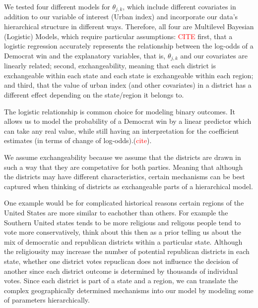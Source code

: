 \documentclass[12pt]{article}
\begin{document}
We tested four different models for $\theta_{j,k}$, which include different covariates in addition to our variable of interest (Urban index) and incorporate our data's hierarchical structure in different ways. Therefore, all four are Multilevel Bayesian (Logistic) Models, which require particular assumptions: \textcolor{red}{CITE} 
first, that a logistic regression accurately represents the relationship between the log-odds of a Democrat win and the explanatory variables, that is, $\theta_{j,k}$ and our covariates are linearly related; second, exchangeability, meaning that each district is exchangeable within each state and each state is exchangeable within each region; and third, that the value of urban index (and other covariates) in a district has a different effect depending on the state/region it belongs to.


The logistic relationship is common choice for modeling binary outcomes. It allows us to model the probability of a Democrat win by a linear predictor which can take any real value, while still having an interpretation for the coefficient estimates (in terms of change of log-odds).(\textcolor{red}{cite}).


We assume exchangeability because  we assume that the districts are drawn in such a way that they are competative for both parties. Meaning that although the districts may have different characteristics, certain mechanisms can be best captured when thinking of districts as exchangeable parts of  a hierarchical model. 


One example would be for complicated historical reasons certain regions of the United States are more similar to eachother than others. For example the Southern United states tends to be more religious and religous people tend to vote more conservatively, think about this then as a prior telling us about the mix of democratic and republican districts within a particular state. Although the religiousity may increase the number of potential republican districts in each state, whether one district votes repuclican does not influence the decision of another since each district outcome is determined by thousands of individual votes. 
Since each district is part of a state and a region, we can translate the complex geographically determined mechanisms into our model by modeling some of parameters hierarchically.

\end{document}
